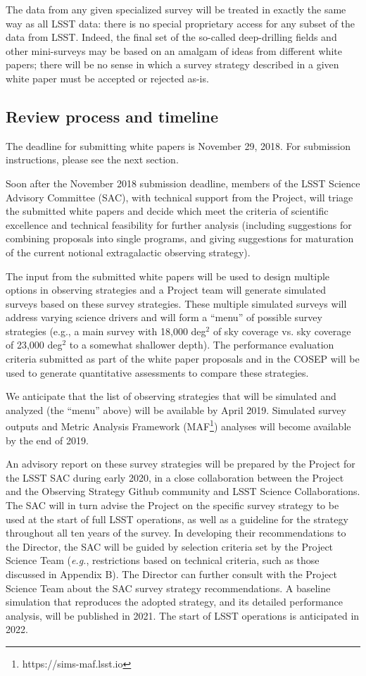\documentclass[DM,lsstdraft,toc,usenatbib]{lsstdoc}
\begin{document}
The data from any given specialized survey will be treated in exactly the same way as all LSST 
data: there is no special proprietary access for any subset of the data from LSST. Indeed, the final set of the so-called
deep-drilling fields and other mini-surveys may be based on an amalgam of ideas from different 
white papers; there will be no sense in which a survey strategy described in a given white paper must be accepted or rejected as-is.  


\subsection{Review process and timeline}

The deadline for submitting white papers is November 29, 2018. For submission instructions, 
please see the next section. 

Soon after the November 2018 submission deadline, members of the LSST Science Advisory Committee (SAC), 
with technical support from the Project, 
will triage the submitted white papers and decide which meet the criteria of scientific excellence and 
technical feasibility for further analysis (including suggestions for combining 
proposals into single programs, and giving suggestions for maturation of the current notional 
extragalactic observing strategy). 

The input from the submitted white papers will be used to design multiple
options in observing strategies and a Project team will generate 
simulated surveys based on these survey strategies. 
These multiple simulated surveys will address varying science drivers and will form a 
``menu'' of possible survey strategies (e.g., a main 
survey with 18,000 deg$^2$ of sky coverage vs. sky coverage of 23,000 deg$^2$ to a
somewhat shallower depth). The performance evaluation criteria submitted as part of the 
white paper proposals and in the COSEP will be used to generate quantitative assessments to compare these strategies. 

We anticipate that the list of observing strategies that will be simulated and analyzed 
(the ``menu'' above) will be available by April 2019. Simulated survey outputs and Metric Analysis 
Framework (MAF\footnote{https://sims-maf.lsst.io}) analyses will become available by the end 
of 2019. 

An advisory report on these survey strategies will be prepared by the Project for the LSST SAC during early 2020, 
in a close collaboration between the Project and the Observing Strategy Github community and 
LSST Science Collaborations. The SAC will in turn advise the Project on the specific survey strategy 
to be used at the start of full LSST operations, as well as a guideline for the strategy throughout all ten years of the survey. 
In developing their recommendations to the Director, the SAC will be guided by selection 
criteria set by the Project Science Team ({\it e.g.}, restrictions based on technical criteria,
such as those discussed in Appendix B). The Director can further consult with the Project Science 
Team about the SAC survey strategy recommendations. A baseline simulation that reproduces the
adopted strategy, and its detailed performance analysis, will be published in 2021. 
The start of LSST operations is anticipated in 2022.
\end{document}
